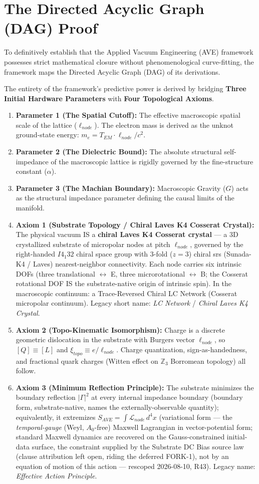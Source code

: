 \section{The Directed Acyclic Graph (DAG) Proof}
To definitively establish that the Applied Vacuum Engineering (AVE) framework possesses strict mathematical closure without phenomenological curve-fitting, the framework maps the Directed Acyclic Graph (DAG) of its derivations.

The entirety of the framework's predictive power is derived by bridging \textbf{Three Initial Hardware Parameters} with \textbf{Four Topological Axioms}.
\begin{enumerate}
    \item \textbf{Parameter 1 (The Spatial Cutoff):} The effective macroscopic spatial scale of the lattice ($\ell_{node}$). The electron mass is derived as the unknot ground-state energy: $m_e = T_{EM} \cdot \ell_{node} / c^2$.
    \item \textbf{Parameter 2 (The Dielectric Bound):} The absolute structural self-impedance of the macroscopic lattice is rigidly governed by the fine-structure constant ($\alpha$).
    \item \textbf{Parameter 3 (The Machian Boundary):} Macroscopic Gravity ($G$) acts as the structural impedance parameter defining the causal limits of the manifold.
    \item \textbf{Axiom 1 (Substrate Topology / Chiral Laves K4 Cosserat Crystal):} The physical vacuum IS a \textbf{chiral Laves K4 Cosserat crystal} --- a 3D crystallized substrate of micropolar nodes at pitch $\ell_{node}$, governed by the right-handed $I4_1 32$ chiral space group with 3-fold ($z=3$) chiral srs (Sunada-K4 / Laves) nearest-neighbor connectivity. Each node carries six intrinsic DOFs (three translational $\leftrightarrow$ E, three microrotational $\leftrightarrow$ B; the Cosserat rotational DOF IS the substrate-native origin of intrinsic spin). In the macroscopic continuum: a Trace-Reversed Chiral LC Network (Cosserat micropolar continuum). Legacy short name: \emph{LC Network} / \emph{Chiral Laves K4 Crystal}.
    \item \textbf{Axiom 2 (Topo-Kinematic Isomorphism):} Charge is a discrete geometric dislocation in the substrate with Burgers vector $\ell_{node}$, so $[Q] \equiv [L]$ and $\xi_{topo} \equiv e/\ell_{node}$. Charge quantization, sign-as-handedness, and fractional quark charges (Witten effect on $\mathbb{Z}_3$ Borromean topology) all follow.
    \item \textbf{Axiom 3 (Minimum Reflection Principle):} The substrate minimizes the boundary reflection $|\Gamma|^2$ at every internal impedance boundary (boundary form, substrate-native, names the externally-observable quantity); equivalently, it extremizes $S_{AVE} = \int \mathcal{L}_{node}\, d^4x$ (variational form --- the \emph{temporal-gauge} (Weyl, $A_0$-free) Maxwell Lagrangian in vector-potential form; standard Maxwell dynamics are recovered on the Gauss-constrained initial-data surface, the constraint supplied by the Substrate DC Bias source law (clause attribution left open, riding the deferred FORK-1), not by an equation of motion of this action --- rescoped 2026-08-10, R43). Legacy name: \emph{Effective Action Principle}.

\end{enumerate}
